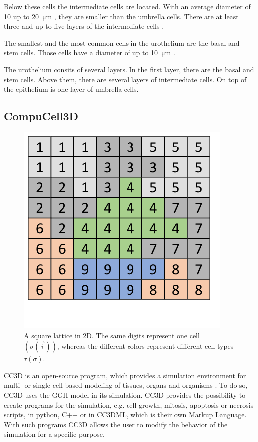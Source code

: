 Below these cells the intermediate cells are located. With an average diameter of 10 up to \SI{20}{\micro\metre} \cite{Yamany2014, PuneetKhandelwal2009}, they are smaller than the umbrella cells. There are at least three and up to five layers of the intermediate cells \cite{PuneetKhandelwal2009}. 

The smallest and the most common cells in the urothelium are the basal and stem cells. Those cells have a diameter of up to \SI{10}{\micro\metre} \cite{Lazzeri2006, PuneetKhandelwal2009}. 

The urothelium consits of several layers. In the first layer, there are the basal and stem cells. Above them, there are several layers of intermediate cells. On top of the epithelium is one layer of umbrella cells.


\subsection{CompuCell3D}
\begin{figure}
	\center
	\includegraphics[scale=0.4]{figures/2DSquareLattice.png}
	\caption{A square lattice in 2D. The same digits represent one cell $(\sigma(\vec{i}))$, whereas the different colors represent different cell types $\tau(\sigma)$.}
	\label{img:2DSquareLattice}
\end{figure}
\ac{CC3D} is an open-source program, which provides a simulation environment for multi- or single-cell-based modeling of tissues, organs and organisms \cite{CC3D.org}. To do so, \ac{CC3D} uses the \ac{GGH} model in its simulation. 
CC3D provides the possibility to create programs for the simulation, e.g. cell growth, mitosis, apoptosis or necrosis scripts, in python, C++ or in CC3DML, which is their own Markup Language. With such programs CC3D allows the user to modify the behavior of the simulation for a specific purpose.
